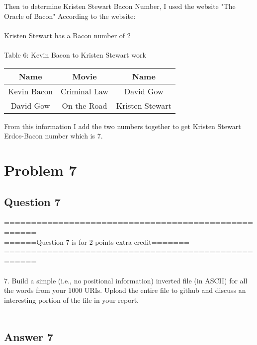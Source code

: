 \documentclass[10pt,letterpaper]{article}
\begin{document}
Then to determine Kristen Stewart Bacon Number, I used the website "The Oracle of Bacon"  According to the website:\\
\\
Kristen Stewart has a Bacon number of 2\\
\\
Table 6: Kevin Bacon to Kristen Stewart work
\begin{center}
  \begin{tabular}{ | c | c | c }
    \hline
      Name & Movie & Name\\ \hline
      Kevin Bacon & Criminal Law & David Gow\\ \hline 
      David Gow & On the Road & Kristen Stewart\\ \hline       
    \hline
  \end{tabular}
\end{center}

From this information I add the two numbers together to get Kristen Stewart Erdos-Bacon number which is 7.


\pagebreak
\section{Problem 7}
\subsection{Question 7}
====================================================\\
======Question 7 is for 2 points extra credit=======\\
====================================================\\
\\
7.  Build a simple (i.e., no positional information) inverted file
(in ASCII) for all the words from your 1000 URIs.  Upload the entire
file to github and discuss an interesting portion of the file in
your report.\\
\\
\subsection{Answer 7}
\end{document}
